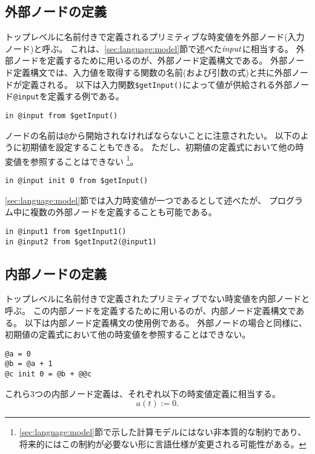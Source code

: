 \subsection{外部ノードの定義}
トップレベルに名前付きで定義されるプリミティブな時変値を外部ノード(入力ノード)と呼ぶ。
これは、\ref{sec:language:model}節で述べた${\it input}$に相当する。
外部ノードを定義するために用いるのが、外部ノード定義構文である。
外部ノード定義構文では、入力値を取得する関数の名前(および引数の式)と共に外部ノードが定義される。
以下は入力関数\texttt{\$getInput()}によって値が供給される外部ノード\texttt{@input}を定義する例である。
\begin{lstlisting}[basicstyle=\ttfamily\small,language=SFRP]
in @input from $getInput()
\end{lstlisting}
ノードの名前は\texttt{@}から開始されなければならないことに注意されたい。
以下のように初期値を設定することもできる。
ただし、初期値の定義式において他の時変値を参照することはできない
\footnote[1]{
\ref{sec:language:model}節で示した計算モデルにはない非本質的な制約であり、
将来的にはこの制約が必要ない形に言語仕様が変更される可能性がある。
}。
\begin{lstlisting}[basicstyle=\ttfamily\small,language=SFRP]
in @input init 0 from $getInput()
\end{lstlisting}
\ref{sec:language:model}節では入力時変値が一つであるとして述べたが、
プログラム中に複数の外部ノードを定義することも可能である。
\begin{lstlisting}[basicstyle=\ttfamily\small,language=SFRP]
in @input1 from $getInput1()
in @input2 from $getInput2(@input1)
\end{lstlisting}

\subsection{内部ノードの定義}
トップレベルに名前付きで定義されたプリミティブでない時変値を内部ノードと呼ぶ。
この内部ノードを定義するために用いるのが、内部ノード定義構文である。
以下は内部ノード定義構文の使用例である。
外部ノードの場合と同様に、初期値の定義式において他の時変値を参照することはできない。
\begin{lstlisting}[basicstyle=\ttfamily\small,language=SFRP]
@a = 0
@b = @a + 1
@c init 0 = @b + @@c
\end{lstlisting}
これら3つの内部ノード定義は、それぞれ以下の時変値定義に相当する。
\begin{equation*}
  a(t) := 0.
\end{equation*}

